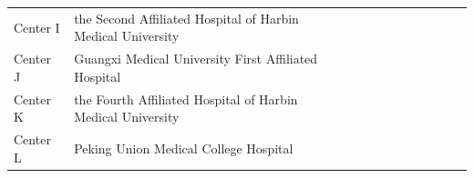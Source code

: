 \begin{landscape}
\begin{center}
\begin{longtable}{p{5.2cm}p{3.0cm}}
Center I & the Second Affiliated Hospital of Harbin Medical University &  &  &  &  &  &  &  &  &  &  &  \\
Center J & Guangxi Medical University First Affiliated Hospital &  &  &  &  &  &  &  &  &  &  &  \\
Center K & the Fourth Affiliated Hospital of Harbin Medical University &  &  &  &  &  &  &  &  &  &  &  \\
Center L & Peking Union Medical College Hospital &  &  &  &  &  &  &  &  &  &  &  \\
    \end{longtable}
    \end{center}
    \end{landscape}
